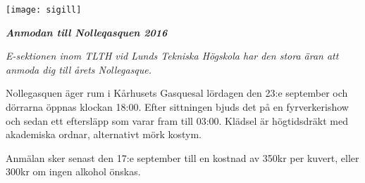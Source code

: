 \documentclass[11pt]{article}
\def\date{2016}
\def\doctitle{Anmodan till Nolleqasquen \date}
\begin{document}

    \begin{center}
        \texttt{[image: sigill]}
        \par
        \vspace*{8mm}

        \textit{\textbf{\Large \doctitle}}

    \end{center}
    \vspace{1mm}

    {\it
    E-sektionen inom TLTH vid Lunds Tekniska Högskola
    har den stora äran att anmoda dig
    till årets Nollegasque.

    \vspace{1mm}

    Nollegasquen äger rum i Kårhusets Gasquesal lördagen den 23:e september och dörrarna öppnas klockan 18:00. Efter sittningen bjuds det på en fyrverkerishow och sedan ett eftersläpp som varar fram till 03:00. Klädsel är högtidsdräkt med akademiska ordnar, alternativt mörk kostym.

    \vspace{1mm}

    Anmälan sker senast den 17:e september till en kostnad av 350kr per kuvert, eller 300kr om ingen alkohol önskas.
    }
\end{document}
